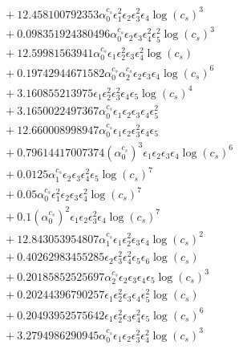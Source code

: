 \documentclass[10pt]{article}
\begin{document}
\begin{align*}
&{}  + 12.458100792353 \alpha_{0}^{c_s} \epsilon_{1}^{2} \epsilon_{2} \epsilon_{3}^{2} \epsilon_{4} \log{\left(c_{s} \right)}^{3} \\
&{}  + 0.098351924380496 \alpha_{0}^{c_s} \epsilon_{2} \epsilon_{3} \epsilon_{4}^{2} \epsilon_{5}^{2} \log{\left(c_{s} \right)}^{3} \\
&{}  + 12.59981563941 \alpha_{0}^{c_s} \epsilon_{1} \epsilon_{2}^{2} \epsilon_{3} \epsilon_{4}^{2} \log{\left(c_{s} \right)} \\
&{}  + 0.19742944671582 \alpha_{0}^{c_s} \alpha_{2}^{c_s} \epsilon_{2} \epsilon_{3} \epsilon_{4} \log{\left(c_{s} \right)}^{6} \\
&{}  + 3.160855213975 \epsilon_{1} \epsilon_{2}^{2} \epsilon_{3}^{2} \epsilon_{4} \epsilon_{5} \log{\left(c_{s} \right)}^{4} \\
&{}  + 3.1650022497367 \alpha_{0}^{c_s} \epsilon_{1} \epsilon_{2} \epsilon_{3} \epsilon_{4} \epsilon_{5}^{2} \\
&{}  + 12.660008998947 \alpha_{0}^{c_s} \epsilon_{1} \epsilon_{2} \epsilon_{3}^{2} \epsilon_{4} \epsilon_{5} \\
&{}  + 0.79614417007374 \left(\alpha_{0}^{c_s}\right)^{3} \epsilon_{1} \epsilon_{2} \epsilon_{3} \epsilon_{4} \log{\left(c_{s} \right)}^{6} \\
&{}  + 0.0125 \alpha_{1}^{c_s} \epsilon_{2} \epsilon_{3} \epsilon_{4}^{2} \epsilon_{5} \log{\left(c_{s} \right)}^{7} \\
&{}  + 0.05 \alpha_{0}^{c_s} \epsilon_{1}^{2} \epsilon_{2} \epsilon_{3} \epsilon_{4}^{2} \log{\left(c_{s} \right)}^{7} \\
&{}  + 0.1 \left(\alpha_{0}^{c_s}\right)^{2} \epsilon_{1} \epsilon_{2} \epsilon_{3}^{2} \epsilon_{4} \log{\left(c_{s} \right)}^{7} \\
&{}  + 12.843053954807 \alpha_{1}^{c_s} \epsilon_{1} \epsilon_{2}^{2} \epsilon_{3} \epsilon_{4} \log{\left(c_{s} \right)}^{2} \\
&{}  + 0.40262983455285 \epsilon_{2} \epsilon_{3}^{2} \epsilon_{4}^{2} \epsilon_{5} \epsilon_{6} \log{\left(c_{s} \right)} \\
&{}  + 0.20185852525697 \alpha_{2}^{c_s} \epsilon_{2} \epsilon_{3} \epsilon_{4} \epsilon_{5} \log{\left(c_{s} \right)}^{3} \\
&{}  + 0.20244396790257 \epsilon_{1} \epsilon_{2}^{2} \epsilon_{3} \epsilon_{4} \epsilon_{5}^{2} \log{\left(c_{s} \right)} \\
&{}  + 0.20493952575642 \epsilon_{1} \epsilon_{2}^{2} \epsilon_{3} \epsilon_{4}^{2} \epsilon_{5} \log{\left(c_{s} \right)}^{6} \\
&{}  + 3.2794986290945 \alpha_{0}^{c_s} \epsilon_{1} \epsilon_{2} \epsilon_{3}^{2} \epsilon_{4}^{2} \log{\left(c_{s} \right)}^{3}
\end{align*}
\end{document}
